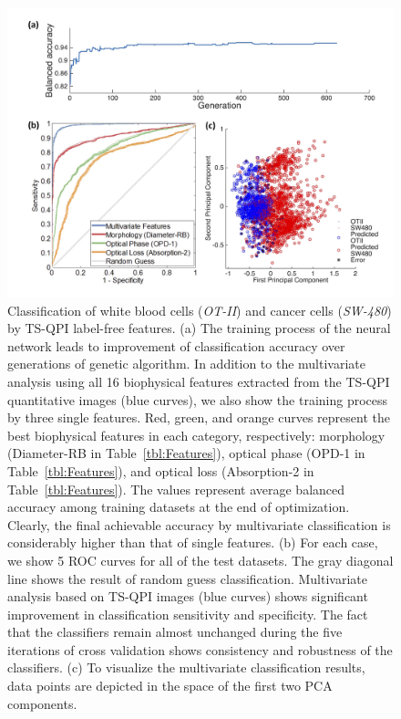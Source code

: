 \documentclass[aps,pra,reprint,superscriptaddress]{revtex4-1}
\begin{document}
\begin{figure}
\includegraphics[scale=0.08]{FigureOTSWROC.jpg}
\caption{\label{fig:OTSWROC} Classification of white blood cells (\textit{OT-II}) and cancer cells (\textit{SW-480}) by TS-QPI label-free features. (a) The training process of the neural network leads to improvement of classification accuracy over generations of genetic algorithm. In addition to the multivariate analysis using all 16 biophysical features extracted from the TS-QPI quantitative images (blue curves), we also show the training process by three single features. Red, green, and orange curves represent the best biophysical features in each category, respectively: morphology (Diameter-RB in Table~\ref{tbl:Features}), optical phase (OPD-1 in Table~\ref{tbl:Features}), and optical loss (Absorption-2 in Table~\ref{tbl:Features}). The values represent average balanced accuracy among training datasets at the end of optimization. Clearly, the final achievable accuracy by multivariate classification is considerably higher than that of single features. (b) For each case, we show 5 ROC curves for all of the test datasets. The gray diagonal line shows the result of random guess classification. Multivariate analysis based on TS-QPI images (blue curves) shows significant improvement in classification sensitivity and specificity. The fact that the classifiers remain almost unchanged during the five iterations of cross validation shows consistency and robustness of the classifiers. (c) To visualize the multivariate classification results, data points are depicted in the space of the first two PCA components.}
\end{figure}
\end{document}

